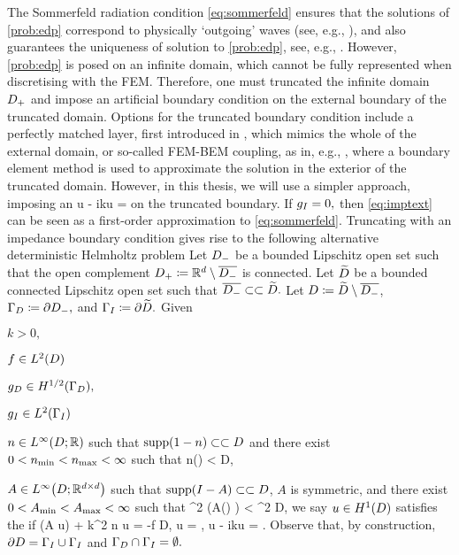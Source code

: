 The Sommerfeld radiation condition \eqref{eq:sommerfeld} ensures that the solutions of \cref{prob:edp} correspond to physically `outgoing' waves (see, e.g., \cite[Section 1.1.3]{Ih:98}), and also guarantees the uniqueness of solution to \cref{prob:edp}, see, e.g., \cite[p. 16]{CoKr:13}. However, \cref{prob:edp} is posed on an infinite domain, which cannot be fully represented when discretising with the FEM. Therefore, one must truncated the infinite domain $D_{+}$ and impose an artificial boundary condition on the external boundary of the truncated domain. Options for the truncated boundary condition include a perfectly matched layer, first introduced in \cite{Be:94}, which mimics the whole of the external domain, or so-called FEM-BEM coupling, as in, e.g., \cite{HiMe:06}, where a boundary element method is used to approximate the solution in the exterior of the truncated domain. However, in this thesis, we will use a simpler approach, imposing an 
\beq\label{eq:imptext}
\dn u - iku = \gI
\eeq
on the truncated boundary. If $g_{I} = 0,$ then \eqref{eq:imptext} can be seen as a first-order approximation to \eqref{eq:sommerfeld}. Truncating with an impedance boundary condition gives rise to the following alternative deterministic Helmholtz problem
\label{prob:tedp}
 Let $D_{-}$ be a bounded Lipschitz open set such that the open complement $D_{+} \coloneqq \mathbb R^{d} \setminus \overline{D_{-}}$ is connected. Let $\widetilde{D}$ be a bounded connected Lipschitz open set such that $\overline{D_{-}} \subset\subset \widetilde{D}.$ Let $D \coloneqq \widetilde{D} \setminus \overline{D_{-}}$, $\Gamma_{D} \coloneqq \partial D_{-},$ and $\Gamma_{I} \coloneqq \partial \widetilde{D}.$ Given
  \bit
  \item $k > 0,$
\item $f \in \LtD$
\item $\gD \in \HhGD,$
  \item $\gI \in \LtGI$
\item $n \in \LiDRR$ such that $\supp\mleft(1-n\mright) \compcont D$ and there exist $0 < n_{\min} < n_{\max} < \infty$ such that
  \beqs
\nmin \leq n(\bx) < \nmax \tfae \bx \in D,
  \eeqs
\item $A \in \LiDRRdtd$ such that $\supp\mleft(I-A\mright)\compcont D$, $A$ is symmetric, and there exist $0 < A_{\min} < A_{\max} < \infty$ such that
  \beqs
\Amin \abs{\bxi}^2 \leq \mleft(A(\bx) \bxi \mright) \cdot \bxibar < \Amax \abs{\bxi}^2 \tfa \bxi \in \CCd \tfae \bx \in D,
  \eeqs
  \eit
  we say $u \in \HoD$ satisfies the  if
  \beqs
\grad \cdot \mleft(A \grad u\mright) + k^2 n u = -f \tin D,
\eeqs
\beqs
\trGD u = \gD, \tand
\eeqs
\beq\label{eq:ibc}
\trGI \dn u - ik\trGI u = \gI.
\eeq
\eprob
Observe that, by construction, $\partial D = \Gamma_{I} \cup \Gamma_{I}$ and $\Gamma_{D} \cap \Gamma_{I} = \emptyset.$

